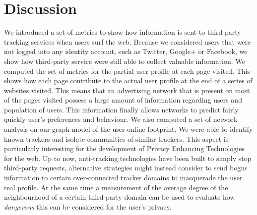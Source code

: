 \section{Discussion}
\noindent
We introduced a set of metrics to show how information is sent to third-party tracking services when users surf the web. Because we considered users that were not logged into any identity account, such as Twitter, Google+ or Facebook, we show how third-party service were still able to collect valuable information.
We computed the set of metrics for the partial user profile at each page visited. This shows how each page contribute to the actual user profile at the end of a series of websites visited. This means that an advertising network that is present on most of the pages visited possess a large amount of information regarding users and population of users. This information finally allows networks to predict fairly quickly user's preferences and behaviour.
We also computed a set of network analysis on our graph model of the user online footprint. We were able to identify known trackers and isolate communities of similar trackers. This aspect is particularly interesting for the development of Privacy Enhancing Technologies for the web. Up to now, anti-tracking technologies have been built to simply stop third-party requests, alternative strategies might instead consider to send bogus information to certain over-connected tracker domains to masquerade the user real profile. At the same time a measurement of the average degree of the neighbourhood of a certain third-party domain can be used to evaluate how \emph{dangerous} this can be considered for the user's privacy.

